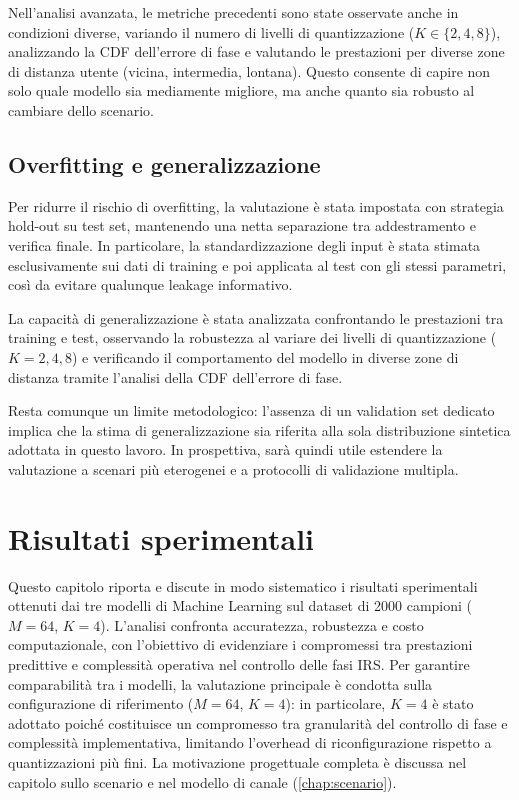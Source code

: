 \documentclass[12pt,a4paper]{report}
\begin{document}
Nell'analisi avanzata, le metriche precedenti sono state osservate
anche in condizioni diverse, variando il numero di livelli di
quantizzazione ($K\in\{2,4,8\}$), analizzando la CDF dell'errore di
fase e valutando le prestazioni per diverse zone di distanza utente
(vicina, intermedia, lontana). Questo consente di capire non solo
quale modello sia mediamente migliore, ma anche quanto sia robusto al
cambiare dello scenario.

\section{Overfitting e generalizzazione}
Per ridurre il rischio di overfitting, la valutazione è stata
impostata con strategia hold-out su test set, mantenendo una netta
separazione tra addestramento e verifica finale. In particolare, la
standardizzazione degli input è stata stimata esclusivamente sui dati
di training e poi applicata al test con gli stessi parametri, così da
evitare qualunque leakage informativo.

La capacità di generalizzazione è stata analizzata confrontando le
prestazioni tra training e test, osservando la robustezza al variare
dei livelli di quantizzazione ($K=2,4,8$) e verificando il
comportamento del modello in diverse zone di distanza tramite
l'analisi della CDF dell'errore di fase.

Resta comunque un limite metodologico: l'assenza di un validation set
dedicato implica che la stima di generalizzazione sia riferita alla
sola distribuzione sintetica adottata in questo lavoro. In
prospettiva, sarà quindi utile estendere la valutazione a scenari più
eterogenei e a protocolli di validazione multipla.

\chapter{Risultati sperimentali}
\label{chap:risultati}
Questo capitolo riporta e discute in modo sistematico i risultati
sperimentali ottenuti dai tre modelli di Machine Learning sul dataset
di 2000 campioni ($M=64$, $K=4$). L'analisi confronta accuratezza,
robustezza e costo computazionale, con l'obiettivo di evidenziare i
compromessi tra prestazioni predittive e complessità operativa nel
controllo delle fasi IRS. Per garantire comparabilità tra i modelli,
la valutazione principale è condotta sulla configurazione di
riferimento ($M=64$, $K=4$): in particolare, $K=4$ è stato adottato
poiché costituisce un compromesso tra granularità del controllo di
fase e complessità implementativa, limitando l'overhead di
riconfigurazione rispetto a quantizzazioni più fini. La motivazione
progettuale completa è discussa nel capitolo sullo scenario e nel
modello di canale (\cref{chap:scenario}).
\end{document}
